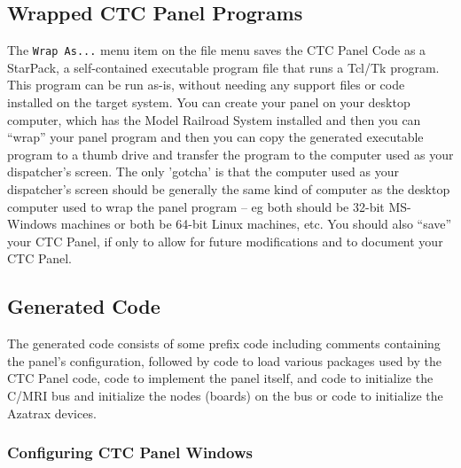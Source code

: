 \subsection{Wrapped CTC Panel Programs}
\label{sect:dispatcher:wrapas}

The \verb=Wrap As...= menu item on the file menu saves the CTC Panel
Code as a StarPack, a self-contained executable program file that runs
a Tcl/Tk program.  This program can be run as-is, without needing any
support files or code installed on the target system.  You can create
your panel on your desktop computer, which has the Model Railroad
System installed and then you can ``wrap'' your panel program and then
you can copy the generated executable program to a thumb drive and
transfer the program to the computer used as your dispatcher's screen.
The only 'gotcha' is that the computer used as your dispatcher's screen
should be generally the same kind of computer as the desktop computer
used to wrap the panel program -- eg both should be 32-bit MS-Windows
machines or both be 64-bit Linux machines, etc. You should also
``save'' your CTC Panel, if only to allow for future modifications and
to document your CTC Panel.  

\subsection{Generated Code}

The generated code consists of some prefix code including comments
containing the panel's configuration, followed by code to load various
packages used by the CTC Panel code, code to implement the panel
itself, and code to initialize the C/MRI bus and initialize the nodes
(boards) on the bus or code to initialize the Azatrax devices.

\subsubsection{Configuring CTC Panel Windows}

